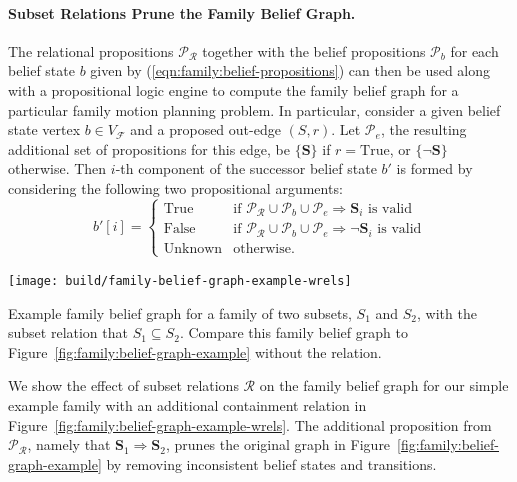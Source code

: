\paragraph{Subset Relations Prune the Family Belief Graph.}
The relational propositions $\mathcal{P}_{\mathcal{R}}$
together with the belief propositions $\mathcal{P}_b$ for
each belief state $b$ given by (\ref{eqn:family:belief-propositions})
can then be used along with a propositional
logic engine to compute the family belief graph
for a particular family motion planning problem.
In particular,
consider a given belief state vertex $b \in V_{\mathcal{F}}$
and a proposed out-edge $(S,r)$.
Let $\mathcal{P}_e$,
the resulting additional set of propositions for this edge,
be $\{ \mathbf{S} \}$ if $r = \mbox{True}$,
or $\{ \lnot\mathbf{S} \}$ otherwise.
Then $i$-th component of the successor belief state $b'$
is formed by considering the following two propositional arguments:
\begin{equation}
   b'[i] = \left\{ \begin{array}{cl}
   \mbox{True}
      & \mbox{if }
      \mathcal{P}_{\mathcal{R}} \cup \mathcal{P}_b \cup \mathcal{P}_e
         \Rightarrow \mathbf{S}_i
      \mbox{ is valid} \\
   \mbox{False}
      & \mbox{if }
      \mathcal{P}_{\mathcal{R}} \cup \mathcal{P}_b \cup \mathcal{P}_e
         \Rightarrow \lnot\mathbf{S}_i
      \mbox{ is valid} \\
   \mbox{Unknown}
      & \mbox{otherwise.}
   \end{array} \right.
\end{equation}

\begin{marginfigure}
   \centering
   \texttt{[image: build/family-belief-graph-example-wrels]}
   \caption{Example family belief graph
      for a family of two subsets, $S_1$ and $S_2$,
      with the subset relation that $S_1 \subseteq S_2$.
      Compare this family belief graph
      to Figure~\ref{fig:family:belief-graph-example}
      without the relation.}
   \label{fig:family:belief-graph-example-wrels}
\end{marginfigure}

We show the effect of subset relations $\mathcal{R}$
on the family belief graph for our simple example family
with an additional containment relation
in Figure~\ref{fig:family:belief-graph-example-wrels}.
The additional proposition from $\mathcal{P}_{\mathcal{R}}$,
namely that $\mathbf{S}_1 \Rightarrow \mathbf{S}_2$,
prunes the original graph
in Figure~\ref{fig:family:belief-graph-example}
by removing inconsistent belief states and transitions.

